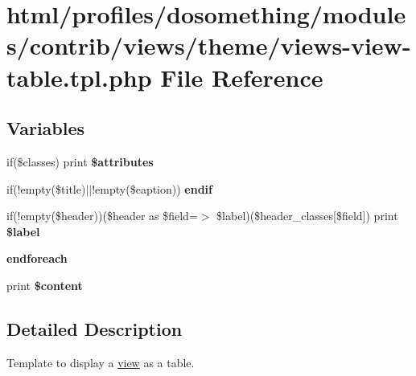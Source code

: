 \hypertarget{views-view-table_8tpl_8php}{
\section{html/profiles/dosomething/modules/contrib/views/theme/views-\/view-\/table.tpl.php File Reference}
\label{views-view-table_8tpl_8php}
}
\subsection*{Variables}
\begin{DoxyCompactItemize}
\item 
\hypertarget{views-view-table_8tpl_8php_ab3bdb2c490dce72e5c032a3eb9cf42f4}{
if(\$classes) print {\bfseries \$attributes}}
\label{views-view-table_8tpl_8php_ab3bdb2c490dce72e5c032a3eb9cf42f4}

\item 
\hypertarget{views-view-table_8tpl_8php_a82cd33ca97ff99f2fcc5e9c81d65251b}{
if(!empty(\$title)$|$$|$!empty(\$caption)) {\bfseries endif}}
\label{views-view-table_8tpl_8php_a82cd33ca97ff99f2fcc5e9c81d65251b}

\item 
\hypertarget{views-view-table_8tpl_8php_ac8728514802698921698e262e7d20778}{
if(!empty(\$header))(\$header as \$field=$>$ \$label)(\$header\_\-classes\mbox{[}\$field\mbox{]}) print {\bfseries \$label}}
\label{views-view-table_8tpl_8php_ac8728514802698921698e262e7d20778}

\item 
\hypertarget{views-view-table_8tpl_8php_a672d9707ef91db026c210f98cc601123}{
{\bfseries endforeach}}
\label{views-view-table_8tpl_8php_a672d9707ef91db026c210f98cc601123}

\item 
\hypertarget{views-view-table_8tpl_8php_ab7b7210f43aa78e34f0b202de894a74c}{
print {\bfseries \$content}}
\label{views-view-table_8tpl_8php_ab7b7210f43aa78e34f0b202de894a74c}

\end{DoxyCompactItemize}


\subsection{Detailed Description}
Template to display a \hyperlink{classview}{view} as a table.


